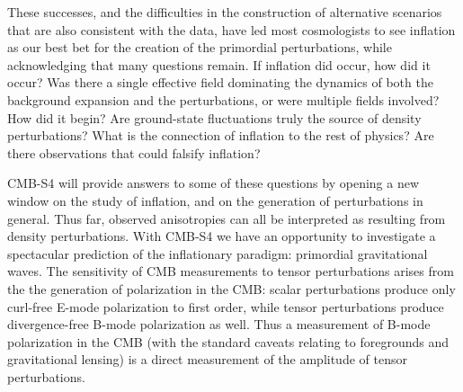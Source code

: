 These successes, and the difficulties in the construction of alternative
scenarios that are also consistent with the data, have led most cosmologists to
see inflation as our best bet for the creation of the primordial perturbations,
while acknowledging that many questions remain. If inflation did occur, how did
it occur? Was there a single effective field dominating the dynamics of both
the background expansion and the perturbations, or were multiple fields
involved? How did it begin? Are ground-state fluctuations truly the source of density
perturbations? What is the connection of inflation to the rest of physics?
Are there observations that could falsify inflation?


CMB-S4 will provide answers to some of these questions by opening a new window on the study of inflation, and on the generation of perturbations in general. Thus far, observed anisotropies can all be interpreted as resulting from density perturbations.  With CMB-S4 we have an opportunity to investigate a spectacular prediction of the inflationary paradigm: primordial gravitational waves. The sensitivity of CMB measurements to tensor perturbations arises from the the generation of polarization in the CMB: scalar perturbations produce only curl-free E-mode polarization to first order, while tensor perturbations produce divergence-free B-mode polarization as well. Thus a measurement of B-mode polarization in the CMB (with the standard caveats relating to foregrounds and gravitational lensing) is a direct measurement of the amplitude of tensor perturbations.

